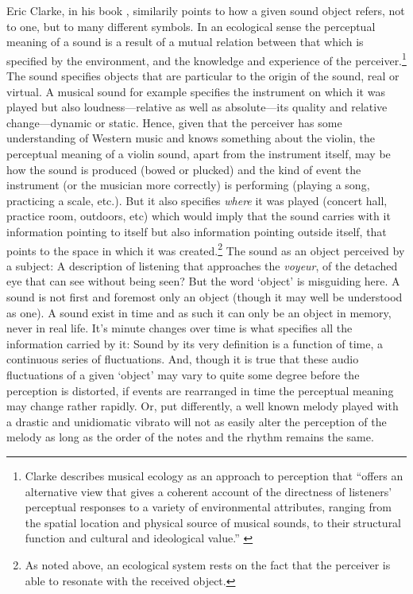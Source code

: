 Eric Clarke, in his book , similarily points to how a given sound object refers, not to one, but to many different symbols. In an ecological sense the perceptual meaning of a sound is a result of a mutual relation between that which is specified by the environment, and the knowledge and experience of the perceiver.\footnote{Clarke describes musical ecology as an approach to perception that ``offers an alternative view that gives a coherent account of the directness of listeners' perceptual responses to a variety of environmental attributes, ranging from the spatial location and physical source of musical sounds, to their structural function and cultural and ideological value.'' \cite[46]{clarke05}} The sound specifies objects that are particular to the origin of the sound, real or virtual. A musical sound for example specifies the instrument on which it was played but also loudness---relative as well as absolute---its quality and relative change---dynamic or static. Hence, given that the perceiver has some understanding of Western music and knows something about the violin, the perceptual meaning of a violin sound, apart from the instrument itself, may be how the sound is produced (bowed or plucked) and the kind of event the instrument (or the musician more correctly) is performing (playing a song, practicing a scale, etc.). But it also specifies \emph{where} it was played (concert hall, practice room, outdoors, etc) which would imply that the sound carries with it information pointing to itself but also information pointing outside itself, that points to the space in which it was created.\footnote{As noted above, an ecological system rests on the fact that the perceiver is able to resonate with the received object.} The sound as an object perceived by a subject: A description of listening that approaches the \emph{voyeur}, of the detached eye that can see without being seen? But the word `object' is misguiding here. A sound is not first and foremost only an object (though it may well be understood as one). A sound exist in time and as such it can only be an object in memory, never in real life. It's minute changes over time is what specifies all the information carried by it: Sound by its very definition is a function of time, a continuous series of fluctuations. And, though it is true that these audio fluctuations of a given `object' may vary to quite some degree before the perception is distorted, if events are rearranged in time the perceptual meaning may change rather rapidly. Or, put differently, a well known melody played with a drastic and unidiomatic vibrato will not as easily alter the perception of the melody as long as the order of the notes and the rhythm remains the same.

